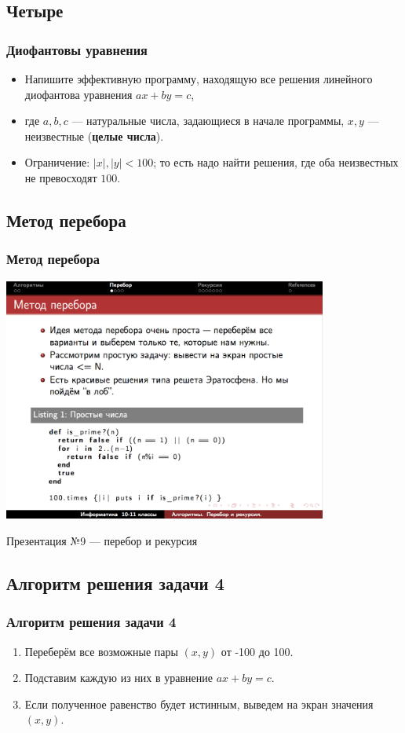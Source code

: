 \documentclass[compress,red]{beamer}
\begin{document}
\subsection{Четыре}
\begin{frame}[fragile]
  \frametitle{Диофантовы уравнения}
  \begin{itemize}
    \item Напишите эффективную программу, находящую все решения линейного диофантова уравнения $ax+by=c$,
    \item где $a, b, c$ --- натуральные числа, задающиеся в начале программы, $x, y$ --- неизвестные (\textbf{целые числа}).
    \item Ограничение: $|x|,|y| < 100$; то есть надо найти решения, где оба неизвестных не превосходят $100$.
  \end{itemize}
\end{frame}

\subsection{Метод перебора}
\begin{frame}[fragile]
  \frametitle{Метод перебора}
  \centerline{\includegraphics[width=0.8\textwidth]{images/screen3.png}}
  \centerline{Презентация №9 --- перебор и рекурсия}
\end{frame}

\subsection{Алгоритм решения задачи 4}
\begin{frame}[fragile]
  \frametitle{Алгоритм решения задачи 4}
  \begin{enumerate}
    \item Переберём все возможные пары $(x,y)$ от -100 до 100.
    \item Подставим каждую из них в уравнение $ax+by=c$.
    \item Если полученное равенство будет истинным, выведем на экран значения $(x,y)$.
  \end{enumerate}
\end{frame}
\end{document}
